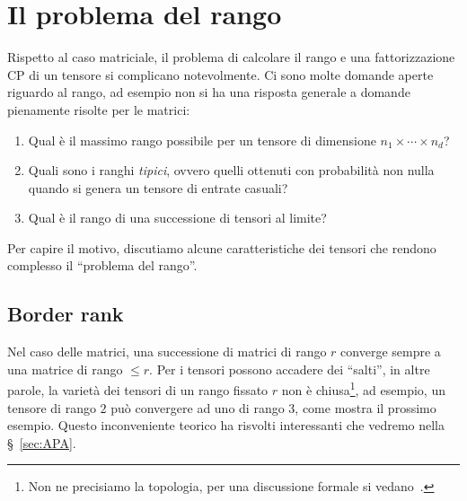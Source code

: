 \section{Il problema del rango}
\label{sec:cp_rank}

Rispetto al caso matriciale, il problema di calcolare il rango e una fattorizzazione CP di un tensore si
complicano notevolmente. Ci sono molte domande aperte riguardo al rango, ad esempio non si ha una
risposta generale a domande pienamente risolte per le matrici:
\begin{enumerate}
	\item Qual è il massimo rango possibile per un tensore di dimensione $ n_1 \times \cdots \times n_d $?
	\item Quali sono i ranghi \emph{tipici}, ovvero quelli ottenuti con probabilità non nulla quando si genera un tensore di entrate casuali?
	\item Qual è il rango di una successione di tensori al limite?
\end{enumerate}
Per capire il motivo, discutiamo alcune caratteristiche dei tensori che rendono complesso il ``problema del
rango''.

\subsection*{Border rank}
Nel caso delle matrici, una successione di matrici di rango $ r $ converge sempre a una matrice di
rango $ \le r $. Per i tensori possono accadere dei ``salti'', in altre parole, la varietà dei
tensori di un rango fissato $ r $ non è chiusa\footnote{Non ne precisiamo la topologia, per una
	discussione formale si vedano~\cite{landsberg2011tensors,landsberg2015geometry}.}, ad esempio, un tensore di rango $ 2 $
può convergere ad uno di rango $ 3 $, come mostra il prossimo esempio. Questo inconveniente teorico
ha risvolti interessanti che vedremo nella \S~\ref{sec:APA}.


